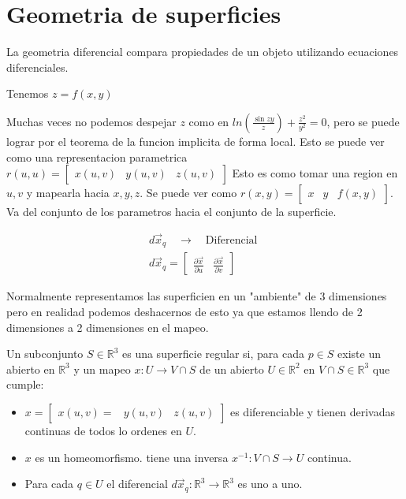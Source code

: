 \documentclass{article}
\newcommand{\caja}[3]{%
  \begin{tcolorbox}[colback=#1!5!white,colframe=#1!25!black,title=#2]
    #3
  \end{tcolorbox}%
}
\begin{document}
\section{Geometria de superficies}

La geometria diferencial compara propiedades de un objeto utilizando ecuaciones diferenciales.

\hfill

Tenemos $ z = f\left(x,y \right) $

\hfill 

Muchas veces no podemos despejar $z$ como en $ ln \left(\frac{\sin{zy }}{z}\right)+ \frac{z^2 }{y^2 }=0$, pero se puede lograr por el teorema de la funcion implicita de forma local. Esto se puede ver como una representacion parametrica $ r(u,u) = \begin{bmatrix} x(u,v) & y\left(u,v\right) & z\left(u,v\right) \end{bmatrix}  $ Esto es como tomar una region en $ u,v  $ y mapearla hacia $ x,y,z $. Se puede ver como $ r(x,y) = \begin{bmatrix} x & y & f\left(x,y\right) \end{bmatrix}  $. Va del conjunto de los parametros hacia el conjunto de la superficie.

\caja{red}{Diferencial del mapeo}{
  \begin{gather}
    d \overrightarrow x_q \quad \rightarrow \quad \text{Diferencial }\\
    d \overrightarrow x_q = \begin{bmatrix} \frac{\partial \overrightarrow x  }{\partial u } & \frac{\partial \overrightarrow x  }{\partial v } \end{bmatrix} 
    \label{eq:diferencial_mapeo}
  \end{gather}
}

Normalmente representamos las superficien en un "ambiente" de 3 dimensiones pero en realidad podemos deshacernos de esto ya que estamos llendo de 2 dimensiones a 2 dimensiones en el mapeo.

\caja{green}{Definicion superficie }{
  Un subconjunto $ S \in \mathbb{R}^ {3 } $ es una superficie regular si, para cada $ p \in S  $ existe un abierto en $ \mathbb{R}^ {3 } $ y un mapeo $ x: U \rightarrow V \cap S  $ de un abierto $ U \in \mathbb{R}^ {2 } $ en $ V \cap S \in \mathbb{R}^ {3 } $ que cumple: 
  \begin{itemize}
    \item $ x = \begin{bmatrix} x\left(u,v \right)= & y\left(u,v \right) & z\left(u,v \right) \end{bmatrix}  $ es diferenciable y tienen derivadas continuas de todos lo ordenes en $U$.
    \item $x$ es un homeomorfismo. tiene una inversa $ x ^ {-1 }: V \cap S \rightarrow  U  $ continua.
    \item Para cada $ q \in U  $ el diferencial $ d \overrightarrow x_q : \mathbb{R}^ {3 }\rightarrow \mathbb{R}^ {3 } $ es uno a uno.
  \end{itemize}
}
\end{document}
